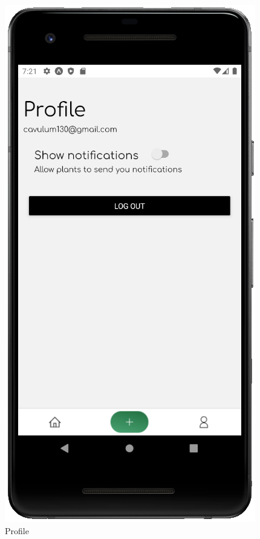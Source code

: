 \documentclass[10pt]{article}
\begin{document}
    \clearpage
    \begin{figure}[h]
     \centering
     \begin{minipage}[h]{0.4\textwidth}
         \centering
         \includegraphics[width=\textwidth]{resources/screens/Profile.PNG}
         \caption{Profile}
     \end{minipage}%
    \end{figure}
    
\end{document}
